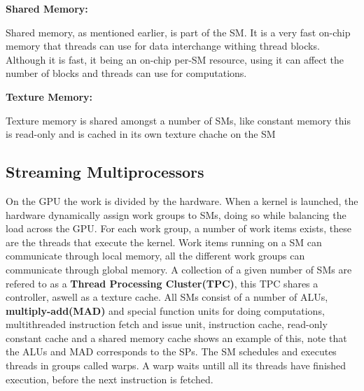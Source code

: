 \textbf{Shared Memory:}

Shared memory, as mentioned earlier, is part of the SM.
It is a very fast on-chip memory that threads can use for data interchange withing thread blocks.
Although it is fast, it being an on-chip per-SM resource, using it can affect the number of blocks and threads can use for computations.

\textbf{Texture Memory:}

Texture memory is shared amongst a number of SMs, like constant memory this is read-only and is cached in its own texture chache on the SM

\subsection{Streaming Multiprocessors}
On the GPU the work is divided by the hardware.
When a kernel is launched, the hardware dynamically assign work groups to SMs, doing so while balancing the load across the GPU.
For each work group, a number of work items exists, these are the threads that execute the kernel.
Work items running on a SM can communicate through local memory, all the different work groups can communicate through global memory. %
A collection of a given number of SMs are refered to as a \textbf{Thread Processing Cluster(TPC)}, this TPC shares a controller, aswell as a texture cache.
All SMs consist of a number of ALUs, \textbf{multiply-add(MAD)} and special function units for doing computations, multithreaded instruction fetch and issue unit, instruction cache, read-only constant cache and a shared memory cache  shows an example of this, note that the ALUs and MAD corresponds to the SPs. %
The SM schedules and executes threads in groups called warps.
A warp waits untill all its threads have finished execution, before the next instruction is fetched. 
